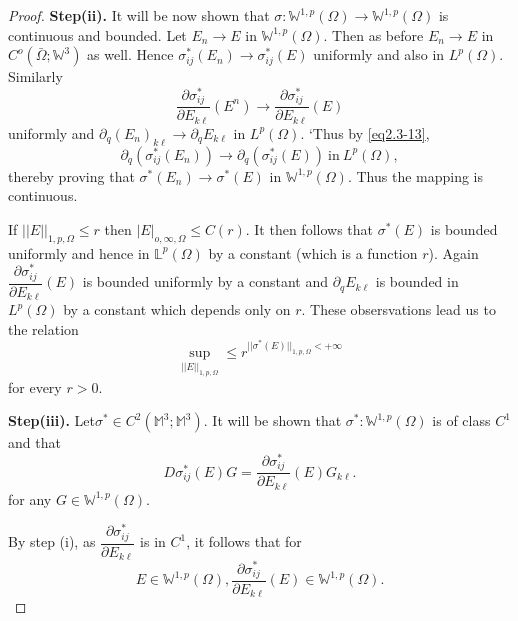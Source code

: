 \begin{proof}
\noindent
\textbf{Step(ii).} It will be now shown that $ \sigma:\mathbb
       {W}^{1,p}(\Omega) \to 
  \mathbb {W}^{1,p}(\Omega)$ is continuous and bounded. Let $E_n \to E
  $ in $\mathbb {W}^{1,p}(\Omega)$. Then as before $E _n \to E$ in
  $C^o ( \bar{\Omega}; \mathbb {W}^3)$ as well. Hence $\sigma^*_{i
    j}(E_n) \to \sigma^*_{i j}(E)$ uniformly and also in $L^p (\Omega
  )$. Similarly 
  $$
  \frac{\partial \sigma^*_{i j}}{\partial E_{k \ell}}(E^n) \to
  \frac{\partial \sigma^*_{i j}}{\partial E _{k \ell}} (E) 
  $$
  uniformly and $ \partial _q (E_n) _{k \ell} \to \partial _q E _{k
    \ell}$ in $L^p(\Omega)$. `Thus by \eqref{eq2.3-13}, 
  $$
  \partial _q (\sigma^*_{ij}(E_n)) \to \partial_q ( \sigma^*_{i j}
  (E)) ~\text{in}~ L^p (\Omega),	 
  $$
  thereby proving that $ \sigma^*(E_n) \to \sigma^* (E) $ in $\mathbb
  {W}^{1,p}(\Omega)$. Thus the mapping is continuous. 
 
  If $ || E ||_{1,p, \Omega} \leq r $ then $ | E |_{o, \infty ,
    \Omega} \leq C (r)$. It then follows that $\sigma^*(E) $ is
  bounded uniformly and hence in $\mathbb {L}^p (\Omega) $ by a
  constant (which is a function $r$). Again $\dfrac{\partial
    \sigma^*_{i j}}{\partial E _{k \ell}} (E) $ is bounded uniformly by
  a constant and $\partial _ q E _ {k \ell} $ is bounded in $L^p
  (\Omega)$ by a constant which depends only on $r$. These
  obsersvations lead us to the relation  
  \begin{equation*}
    \sup_{|| E ||_{1,p , \Omega}} \leq r ^{|| \sigma^* (E)
      ||_{1,p,\Omega}< + \infty} \tag{2.3-18} \label{eq2.3-18}
  \end{equation*} 
  for every $r > 0$.	

\noindent
\textbf{Step(iii).} Let\pageoriginale $ \sigma^* \in C^2 ( \mathbb {M}^3; \mathbb
       {M}^3)$. It will 
  be shown that $\sigma^*: \mathbb{W}^{1,p}( \Omega ) $ is of class
  $C^1$ and that   
 \begin{equation*}
   D \sigma^*_{i j}(E) G= \frac{\partial \sigma^*_{ij}}{\partial E _{k
       \ell}}(E) G _{k \ell}. \tag{2.3-19} \label{eq2.3-19}
 \end{equation*} 
 for any $G \in \mathbb {W}^{1,p}( \Omega)$.
 
By step (i), as $\dfrac{\partial \sigma^*_{i j}} {\partial E_{k \ell}}$ is
in $C^1$, it follows that for  
 $$
 E \in \mathbb {W}^{1,p}( \Omega ) , \frac{\partial \sigma^*_{i j}}
 {\partial E _{k \ell}}(E) \in \mathbb {W}^{1,p}( \Omega ) . 
 $$
 

\end{proof}

